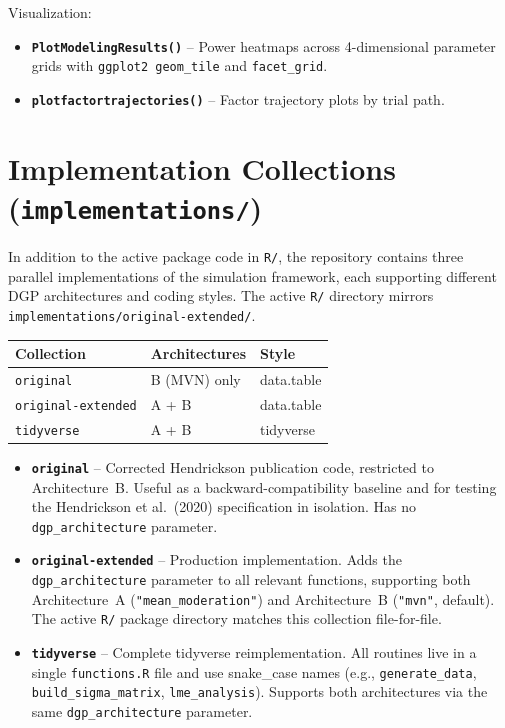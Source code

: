 \documentclass[11pt]{article}
\begin{document}
Visualization:

\begin{itemize}
  \item \textbf{\texttt{PlotModelingResults()}} -- Power heatmaps across
    4-dimensional parameter grids with \texttt{ggplot2 geom\_tile}
    and \texttt{facet\_grid}.
  \item \textbf{\texttt{plotfactortrajectories()}} -- Factor trajectory plots
    by trial path.
\end{itemize}

\section{Implementation Collections (\texttt{implementations/})}
\label{sec:impl}

In addition to the active package code in \texttt{R/}, the
repository contains three parallel implementations of the
simulation framework, each supporting different DGP
architectures and coding styles. The active \texttt{R/}
directory mirrors \texttt{implementations/original-extended/}.

\begin{table}[h]
\centering
\begin{tabular}{lll}
\toprule
Collection & Architectures & Style \\
\midrule
\texttt{original} & B (MVN) only & data.table \\
\texttt{original-extended} & A + B & data.table \\
\texttt{tidyverse} & A + B & tidyverse \\
\bottomrule
\end{tabular}
\end{table}

\begin{itemize}
  \item \textbf{\texttt{original}} -- Corrected Hendrickson
    publication code, restricted to Architecture~B. Useful as
    a backward-compatibility baseline and for testing the
    Hendrickson et al.\ (2020) specification in isolation. Has
    no \texttt{dgp\_architecture} parameter.

  \item \textbf{\texttt{original-extended}} -- Production
    implementation. Adds the \texttt{dgp\_architecture}
    parameter to all relevant functions, supporting both
    Architecture~A (\texttt{"mean\_moderation"}) and
    Architecture~B (\texttt{"mvn"}, default). The active
    \texttt{R/} package directory matches this collection
    file-for-file.

  \item \textbf{\texttt{tidyverse}} -- Complete tidyverse
    reimplementation. All routines live in a single
    \texttt{functions.R} file and use snake\_case names
    (e.g., \texttt{generate\_data},
    \texttt{build\_sigma\_matrix}, \texttt{lme\_analysis}).
    Supports both architectures via the same
    \texttt{dgp\_architecture} parameter.
\end{itemize}
\end{document}
